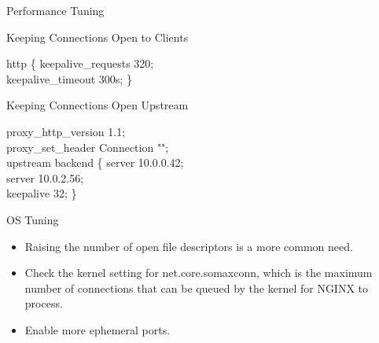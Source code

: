 \documentclass{beamer}
\begin{document}
\begin{frame}{Performance Tuning}
\begin{block}{Keeping Connections Open to Clients}
	\vspace{0.02\textheight}
	\scriptsize
	\begin{Alms*}
		http \{ \NI
		keepalive\_requests 320; \\
		keepalive\_timeout 300s;
		\ND \}
	\end{Alms*}
\end{block}

\begin{block}{Keeping Connections Open Upstream}
	\vspace{0.02\textheight}
	\scriptsize
	\begin{Alms*}
		proxy\_http\_version 1.1; \\
		proxy\_set\_header Connection ""; \\
		upstream backend \{ \NI
			server 10.0.0.42; \\
			server 10.0.2.56; \\
			keepalive 32;
		\ND \}
	\end{Alms*}
\end{block}
\end{frame}


\begin{frame}{OS Tuning}
\begin{itemize}
	\item Raising the number of open file descriptors is a more common need.
	\item Check the kernel setting for net.core.somaxconn, which is the maximum number of connections that can be queued by the kernel for NGINX to process. 
	\item Enable more ephemeral ports. 
\end{itemize}

\end{frame}

%
%	
\end{document}
